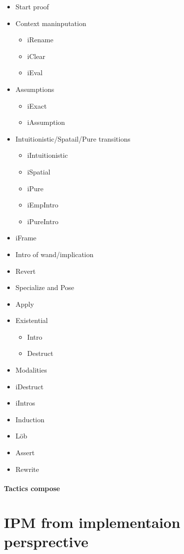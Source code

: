 \begin{itemize}
\item Start proof
\item Context maninputation
  \begin{itemize}
  \item iRename
  \item iClear
  \item iEval
  \end{itemize}
\item Assumptions
  \begin{itemize}
  \item iExact
  \item iAssumption
  \end{itemize}
\item Intuitionistic/Spatail/Pure transitions
  \begin{itemize}
  \item iIntuitionistic
  \item iSpatial
  \item iPure
  \item iEmpIntro
  \item iPureIntro
  \end{itemize}
\item iFrame
\item Intro of wand/implication
\item Revert
\item Specialize and Pose
\item Apply
\item Existential
  \begin{itemize}
  \item Intro
  \item Destruct
  \end{itemize}
\item Modalities
\item iDestruct
\item iIntros
\item Induction
\item Löb
\item Assert
\item Rewrite
\end{itemize}

\paragraph{Tactics compose}

\section{IPM from implementaion persprective}
\label{sec:ipm_implementation}


